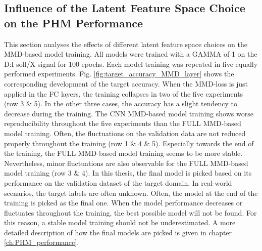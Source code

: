 \subsection{Influence of the Latent Feature Space Choice on the PHM Performance}\label{ch:Influence_Layer_real_dataset}
This section analyses the effects of different latent feature space choices on the MMD-based model training. All models were trained with a GAMMA of 1 on the D:I soll/X signal for 100 epochs. Each model training was repeated in five equally performed experiments. Fig. \ref{fig:target_accuracy_MMD_layer} shows the corresponding development of the target accuracy. When the MMD-loss is just applied in the FC layers, the training collapses in two of the five experiments (row 3 $\&$ 5). In the other three cases, the accuracy has a slight tendency to decrease during the training. The CNN MMD-based model training shows worse reproducibility throughout the five experiments than the FULL MMD-based model training. Often, the fluctuations on the validation data are not reduced properly throughout the training (row 1 $\&$ 4 $\&$ 5). Especially towards the end of the training, the FULL MMD-based model training seems to be more stable. Nevertheless, minor fluctuations are also observable for the FULL MMD-based model training (row 3 $\&$ 4). In this thesis, the final model is picked based on its performance on the validation dataset of the target domain. In real-world scenarios, the target labels are often unknown. Often, the model at the end of the training is picked as the final one. When the model performance decreases or fluctuates throughout the training, the best possible model will not be found. For this reason, a stable model training should not be underestimated. A more detailed description of how the final models are picked is given in chapter \ref{ch:PHM_performance}. 

